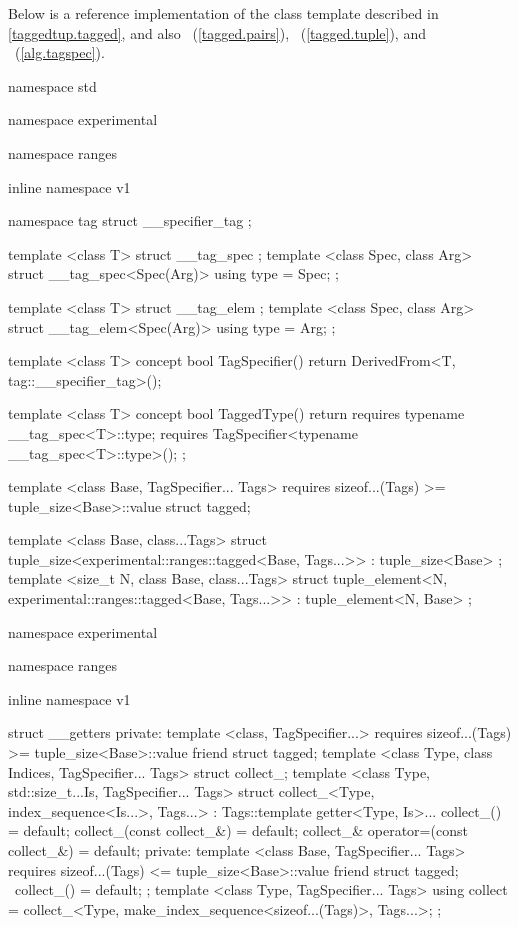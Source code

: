 \setcounter{chapter}{4}

\pnum Below is a reference implementation of the  class template described in
\ref{taggedtup.tagged}, and also ~(\ref{tagged.pairs}),
~(\ref{tagged.tuple}), and ~(\ref{alg.tagspec}).

\begin{codeblock}
namespace std { namespace experimental { namespace ranges { inline namespace v1 {
  namespace tag { struct __specifier_tag { }; }

  template <class T>
  struct __tag_spec { };
  template <class Spec, class Arg>
  struct __tag_spec<Spec(Arg)> { using type = Spec; };

  template <class T>
  struct __tag_elem { };
  template <class Spec, class Arg>
  struct __tag_elem<Spec(Arg)> { using type = Arg; };

  template <class T>
  concept bool TagSpecifier() {
    return DerivedFrom<T, tag::__specifier_tag>();
  }

  template <class T>
  concept bool TaggedType() {
    return requires {
      typename __tag_spec<T>::type;
      requires TagSpecifier<typename __tag_spec<T>::type>();
    };
  }

  template <class Base, TagSpecifier... Tags>
    requires sizeof...(Tags) >= tuple_size<Base>::value
  struct tagged;
  }}}

  template <class Base, class...Tags>
  struct tuple_size<experimental::ranges::tagged<Base, Tags...>>
    : tuple_size<Base> { };
  template <size_t N, class Base, class...Tags>
  struct tuple_element<N, experimental::ranges::tagged<Base, Tags...>>
    : tuple_element<N, Base> { };

  namespace experimental { namespace ranges { inline namespace v1 {

  struct __getters {
  private:
    template <class, TagSpecifier...>
      requires sizeof...(Tags) >= tuple_size<Base>::value
    friend struct tagged;
    template <class Type, class Indices, TagSpecifier... Tags>
    struct collect_;
    template <class Type, std::size_t...Is, TagSpecifier... Tags>
    struct collect_<Type, index_sequence<Is...>, Tags...>
      : Tags::template getter<Type, Is>... {
      collect_() = default;
      collect_(const collect_&) = default;
      collect_& operator=(const collect_&) = default;
    private:
      template <class Base, TagSpecifier... Tags>
        requires sizeof...(Tags) <= tuple_size<Base>::value
      friend struct tagged;
      ~collect_() = default;
    };
    template <class Type, TagSpecifier... Tags>
    using collect = collect_<Type, make_index_sequence<sizeof...(Tags)>, Tags...>;
  };

}}}}
\end{codeblock}
